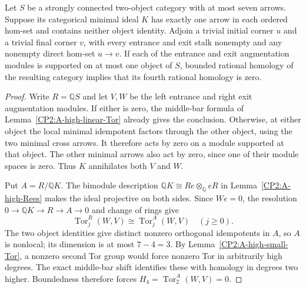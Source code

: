 \begin{lemma}
\label{CP2:A-small-pair-augmentation-Tor}
Let $S$ be a strongly connected two-object category with at most
seven arrows. Suppose its categorical minimal ideal $K$ has
exactly one arrow in each ordered hom-set and contains neither
object identity. Adjoin a trivial initial corner $u$ and a trivial
final corner $v$, with every entrance and exit stalk nonempty
and any nonempty direct hom-set $u\to v$. If each of the entrance
and exit augmentation modules is supported on at most one object
of $S$, bounded rational homology of the resulting category
implies that its fourth rational homology is zero.
\end{lemma}
\begin{proof}
Write $R=\mathbb QS$ and let $V,W$ be the left entrance and
right exit augmentation modules. If either is zero, the
middle-bar formula of Lemma~\ref{CP2:A-high-linear-Tor} already
gives the conclusion. Otherwise, at either object the local
minimal idempotent factors through the other object, using
the two minimal cross arrows. It therefore acts by zero on
a module supported at that object. The other minimal arrows
also act by zero, since one of their module spaces is zero.
Thus $K$ annihilates both $V$ and $W$.

Put $A=R/\mathbb QK$. The bimodule description
$\mathbb QK\cong Re\otimes_{\mathbb Q}eR$ in
Lemma~\ref{CP2:A-high-Rees} makes the ideal projective on both
sides. Since $We=0$, the resolution
$0\to\mathbb QK\to R\to A\to0$ and change of rings give
\[
 \operatorname{Tor}_j^R(W,V)\cong
 \operatorname{Tor}_j^A(W,V)\quad(j\ge0).
\]
The two object identities give distinct nonzero orthogonal
idempotents in $A$, so $A$ is nonlocal; its dimension is at
most $7-4=3$. By Lemma~\ref{CP2:A-high-small-Tor}, a nonzero
second Tor group would force nonzero Tor in arbitrarily high
degrees. The exact middle-bar shift identifies these with
homology in degrees two higher. Boundedness therefore forces
$H_4=\operatorname{Tor}_2^A(W,V)=0$.
\end{proof}

